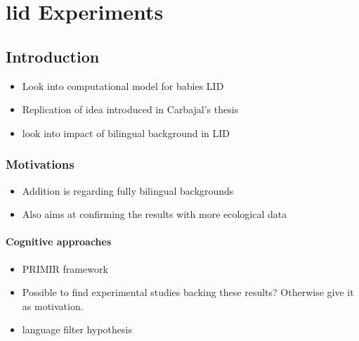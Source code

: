 \chapter{\acrshort{lid} Experiments}\label{Section: LID}


\section{Introduction}

\begin{itemize}
    \renewcommand\labelitemi{--}
    \item Look into computational model for babies LID
    \item Replication of idea introduced in Carbajal's thesis
    \item look into impact of bilingual background in LID
\end{itemize}


\subsection{Motivations}

\begin{itemize}
    \renewcommand\labelitemi{--}
    \item Addition is regarding fully bilingual backgrounds
    \item Also aims at confirming the results with more ecological data 
\end{itemize}

\subsubsection{Cognitive approaches}


\begin{itemize}
    \renewcommand\labelitemi{--}
    \item PRIMIR framework
    \item Possible to find experimental studies backing these results? Otherwise give it as motivation. 
    \item language filter hypothesis
\end{itemize}

